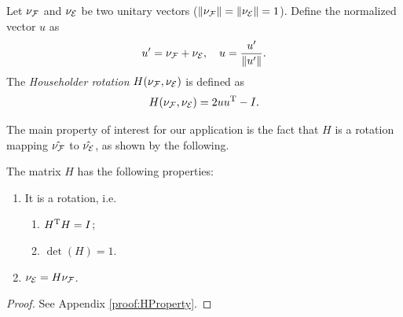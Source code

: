 \documentclass[journal]{IEEEtran}  %
\begin{document}
  \begin{definition} Let $\nu_{\mathcal{F}}$ and $\nu_{\mathcal{E}}$ be two unitary vectors ($\lVert\nu_{\mathcal{F}}\rVert=\lVert\nu_{\mathcal{E}}\rVert=1$). Define the normalized vector $u$ as
    \begin{equation}
      u'=\nu_{\mathcal{F}}+\nu_{\mathcal{E}},\quad u =\frac{u'}{\lVert u'\rVert}.
    \end{equation}
    The \emph{Householder rotation} $H(\nu_{\mathcal{F}},\nu_{\mathcal{E}})$ is defined as
    \begin{equation}\label{eq:H definition}
      H(\nu_{\mathcal{F}},\nu_{\mathcal{E}}) = 2 u u^\mathrm{T}-I.
    \end{equation}
  \end{definition}
  The main property of interest for our application is the fact that $H$ is a rotation mapping $\hat{\nu_{\mathcal{F}}}$ to $\hat{\nu_{\mathcal{E}}}$, as shown by the following.
  \begin{proposition}\label{prop:HProperty}
    The matrix $H$ has the following properties:
    \begin{enumerate}
    \item It is a rotation, i.e.
      \begin{enumerate}
      \item\label{it:orthonormality} $H^\mathrm{T} H=I$;
      \item\label{it:determinant} $\det(H)=1$.
      \end{enumerate}
    \item\label{it:transformation} $\nu_{\mathcal{E}}=H \nu_{\mathcal{F}}$.
    \end{enumerate}
  \end{proposition}
  \begin{proof}
  	See Appendix \ref{proof:HProperty}.
  \end{proof}
\end{document}
